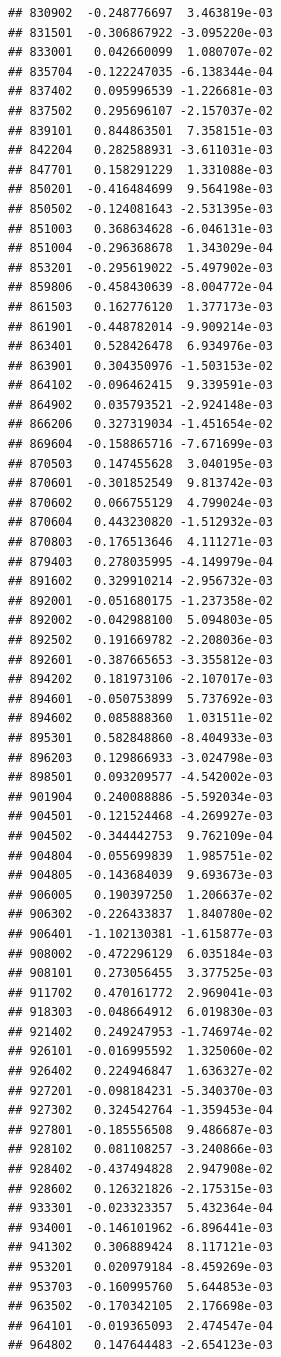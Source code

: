 \documentclass[ignorenonframetext,]{beamer}
\begin{document}
\begin{frame}[fragile]
\begin{verbatim}
## 830902  -0.248776697  3.463819e-03
## 831501  -0.306867922 -3.095220e-03
## 833001   0.042660099  1.080707e-02
## 835704  -0.122247035 -6.138344e-04
## 837402   0.095996539 -1.226681e-03
## 837502   0.295696107 -2.157037e-02
## 839101   0.844863501  7.358151e-03
## 842204   0.282588931 -3.611031e-03
## 847701   0.158291229  1.331088e-03
## 850201  -0.416484699  9.564198e-03
## 850502  -0.124081643 -2.531395e-03
## 851003   0.368634628 -6.046131e-03
## 851004  -0.296368678  1.343029e-04
## 853201  -0.295619022 -5.497902e-03
## 859806  -0.458430639 -8.004772e-04
## 861503   0.162776120  1.377173e-03
## 861901  -0.448782014 -9.909214e-03
## 863401   0.528426478  6.934976e-03
## 863901   0.304350976 -1.503153e-02
## 864102  -0.096462415  9.339591e-03
## 864902   0.035793521 -2.924148e-03
## 866206   0.327319034 -1.451654e-02
## 869604  -0.158865716 -7.671699e-03
## 870503   0.147455628  3.040195e-03
## 870601  -0.301852549  9.813742e-03
## 870602   0.066755129  4.799024e-03
## 870604   0.443230820 -1.512932e-03
## 870803  -0.176513646  4.111271e-03
## 879403   0.278035995 -4.149979e-04
## 891602   0.329910214 -2.956732e-03
## 892001  -0.051680175 -1.237358e-02
## 892002  -0.042988100  5.094803e-05
## 892502   0.191669782 -2.208036e-03
## 892601  -0.387665653 -3.355812e-03
## 894202   0.181973106 -2.107017e-03
## 894601  -0.050753899  5.737692e-03
## 894602   0.085888360  1.031511e-02
## 895301   0.582848860 -8.404933e-03
## 896203   0.129866933 -3.024798e-03
## 898501   0.093209577 -4.542002e-03
## 901904   0.240088886 -5.592034e-03
## 904501  -0.121524468 -4.269927e-03
## 904502  -0.344442753  9.762109e-04
## 904804  -0.055699839  1.985751e-02
## 904805  -0.143684039  9.693673e-03
## 906005   0.190397250  1.206637e-02
## 906302  -0.226433837  1.840780e-02
## 906401  -1.102130381 -1.615877e-03
## 908002  -0.472296129  6.035184e-03
## 908101   0.273056455  3.377525e-03
## 911702   0.470161772  2.969041e-03
## 918303  -0.048664912  6.019830e-03
## 921402   0.249247953 -1.746974e-02
## 926101  -0.016995592  1.325060e-02
## 926402   0.224946847  1.636327e-02
## 927201  -0.098184231 -5.340370e-03
## 927302   0.324542764 -1.359453e-04
## 927801  -0.185556508  9.486687e-03
## 928102   0.081108257 -3.240866e-03
## 928402  -0.437494828  2.947908e-02
## 928602   0.126321826 -2.175315e-03
## 933301  -0.023323357  5.432364e-04
## 934001  -0.146101962 -6.896441e-03
## 941302   0.306889424  8.117121e-03
## 953201   0.020979184 -8.459269e-03
## 953703  -0.160995760  5.644853e-03
## 963502  -0.170342105  2.176698e-03
## 964101  -0.019365093  2.474547e-04
## 964802   0.147644483 -2.654123e-03

\end{verbatim}
\end{frame}
\end{document}
